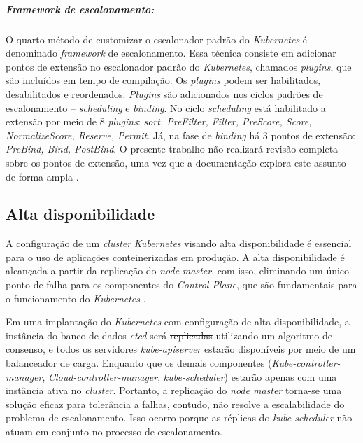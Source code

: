 \documentclass[
	12pt,				%
	openright,			%
	oneside,			%
	a4paper,			%
	brazil				%
	]{abntex2}
\providecommand{\DIFaddtex}[1]{{\protect\color{blue}\uwave{#1}}} %
\providecommand{\DIFdeltex}[1]{{\protect\color{red}\sout{#1}}}                      %
\providecommand{\DIFaddbegin}{} %
\providecommand{\DIFaddend}{} %
\providecommand{\DIFdelbegin}{} %
\providecommand{\DIFdelend}{} %
\providecommand{\DIFadd}[1]{\texorpdfstring{\DIFaddtex{#1}}{#1}} %
\providecommand{\DIFdel}[1]{\texorpdfstring{\DIFdeltex{#1}}{}} %
\newcommand{\DIFscaledelfig}{0.5}
\newlength{\DIFdelgraphicswidth} %
\newlength{\DIFdelgraphicsheight} %
\newcommand{\DIFaddincludegraphics}[2][]{{\color{blue}\fbox{\DIFOincludegraphics[#1]{#2}}}} %
\newcommand{\DIFdelincludegraphics}[2][]{%
\sbox{\DIFdelgraphicsbox}{\DIFOincludegraphics[#1]{#2}}%
\settoboxwidth{\DIFdelgraphicswidth}{\DIFdelgraphicsbox} %
\settoboxtotalheight{\DIFdelgraphicsheight}{\DIFdelgraphicsbox} %
\scalebox{\DIFscaledelfig}{%
\parbox[b]{\DIFdelgraphicswidth}{\usebox{\DIFdelgraphicsbox}\\[-\baselineskip] \rule{\DIFdelgraphicswidth}{0em}}\llap{\resizebox{\DIFdelgraphicswidth}{\DIFdelgraphicsheight}{%
\setlength{\unitlength}{\DIFdelgraphicswidth}%
\begin{picture}(1,1)%
\thicklines\linethickness{2pt} %
{\color[rgb]{1,0,0}\put(0,0){\framebox(1,1){}}}%
{\color[rgb]{1,0,0}\put(0,0){\line( 1,1){1}}}%
{\color[rgb]{1,0,0}\put(0,1){\line(1,-1){1}}}%
\end{picture}%
}\hspace*{3pt}}} %
} %
\DeclareRobustCommand{\DIFaddbegin}{\DIFOaddbegin \let\includegraphics\DIFaddincludegraphics} %
\DeclareRobustCommand{\DIFaddend}{\DIFOaddend \let\includegraphics\DIFOincludegraphics} %
\DeclareRobustCommand{\DIFdelbegin}{\DIFOdelbegin \let\includegraphics\DIFdelincludegraphics} %
\DeclareRobustCommand{\DIFdelend}{\DIFOaddend \let\includegraphics\DIFOincludegraphics} %
\begin{document}
\subparagraph{\textit{Framework} de escalonamento:}
O quarto método de customizar o escalonador padrão do \textit{Kubernetes} é denominado \textit{framework} de escalonamento. Essa técnica consiste em adicionar pontos de extensão no escalonador padrão do \textit{Kubernetes}, chamados \textit{plugins}, que são incluídos em tempo de compilação. Os \textit{plugins} podem ser habilitados, desabilitados e reordenados. \textit{Plugins} são adicionados nos ciclos padrões de escalonamento -- \textit{scheduling} e \textit{binding}. No ciclo \textit{scheduling} está habilitado a extensão por meio de 8 \textit{plugins}: \textit{sort, PreFilter, Filter, PreScore, Score, NormalizeScore, Reserve, Permit}. Já, na fase de \textit{binding} há 3 pontos de extensão: \textit{PreBind, Bind, PostBind}. O presente trabalho não realizará revisão completa sobre os pontos de extensão, uma vez que a documentação explora este assunto de forma ampla \cite{schedulerframework}.

\DIFaddbegin \DIFadd{\textcolor{red}{TODO: qual voce usará? Deixe claro aqui.}
}

\DIFaddend \subsection{Alta disponibilidade}
A configuração de um \textit{cluster} \textit{Kubernetes} visando alta disponibilidade é essencial para o uso de aplicações conteinerizadas em produção. A alta disponibilidade é alcançada a partir da replicação do \textit{node} \textit{master}, com isso, eliminando um único ponto de falha para os componentes do \textit{Control Plane}, que são fundamentais para o funcionamento do \textit{Kubernetes} \cite{Kubeha}.

Em uma implantação do \textit{Kubernetes} com configuração \DIFaddbegin \DIFadd{padrão }\DIFaddend de alta disponibilidade, a instância do banco de dados \textit{etcd} será \DIFdelbegin \DIFdel{replicadas }\DIFdelend \DIFaddbegin \DIFadd{replicada, }\DIFaddend utilizando um algoritmo de consenso, e todos os servidores \textit{kube-apiserver} estarão disponíveis por meio de um balanceador de carga. \DIFdelbegin \DIFdel{Enquanto que }\DIFdelend \DIFaddbegin \DIFadd{Ainda, }\DIFaddend os demais componentes (\textit{Kube-controller-manager}, \textit{Cloud-controller-manager}, \textit{kube-scheduler}) estarão apenas com uma instância ativa no \textit{cluster}. Portanto, a replicação do \textit{node master} torna-se uma solução eficaz para tolerância a falhas, contudo, não resolve a escalabilidade do problema de escalonamento. Isso ocorro porque as réplicas do \textit{kube-scheduler} não atuam em conjunto no processo de escalonamento.
\end{document}
